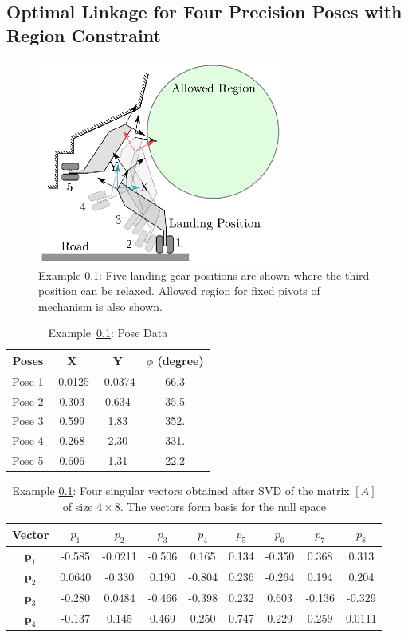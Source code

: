 \documentclass[twocolumn,10pt]{asme2ej}
\begin{document}
\subsection{Optimal Linkage for Four Precision Poses with Region Constraint}\label{4pos1line1pose}
\begin{figure}
\centering
\includegraphics[width=230pt]{figure/fig2.eps}
\caption{Example \ref{4pos1line1pose}: Five landing gear positions are shown where the third position can be relaxed. Allowed region for fixed pivots of mechanism is also shown.}
\label{4posproblem}
\end{figure}

\begin{table}
\caption{Example~\ref{4pos1line1pose}: Pose Data}
\centering
\label{4posMotion}
\begin{tabular}{cccc}
\hline
Poses & X & Y & $\phi$ (degree)\\
\hline
Pose 1 &  -0.0125 & -0.0374 & 66.3 \\
Pose 2 &  0.303 & 0.634 & 35.5 \\
Pose 3 &  0.599 & 1.83 & 352. \\
Pose 4 &  0.268 & 2.30 & 331. \\
Pose 5 &  0.606 & 1.31 & 22.2 \\
\hline
\end{tabular}
\end{table}

\begin{table}[thb]
  \caption{Example \ref{4pos1line1pose}: Four singular vectors obtained after SVD of the matrix $[A]$ of size $4\times8$. The vectors form basis for the null space}
  \centering
  \begin{tabular}{ccccccccc}
  \hline
  Vector &$p_1$&$p_2$&$p_3$&$p_4$&$p_5$&$p_6$&$p_7$&$p_8$\\
    \hline
   $\textbf{p}_1$& -0.585 & -0.0211 & -0.506 & 0.165 & 0.134 & -0.350 & 0.368 & 0.313 \\
   $\textbf{p}_2$& 0.0640 & -0.330 & 0.190 & -0.804 & 0.236 & -0.264 & 0.194 & 0.204 \\
   $\textbf{p}_3$& -0.280 & 0.0484 & -0.466 & -0.398 & 0.232 & 0.603 & -0.136 & -0.329 \\
   $\textbf{p}_4$& -0.137 & 0.145 & 0.469 & 0.250 & 0.747 & 0.229 & 0.259 & 0.0111 \\
    \hline
  \end{tabular}
  \label{svectors4pos}
\end{table}
\end{document}
